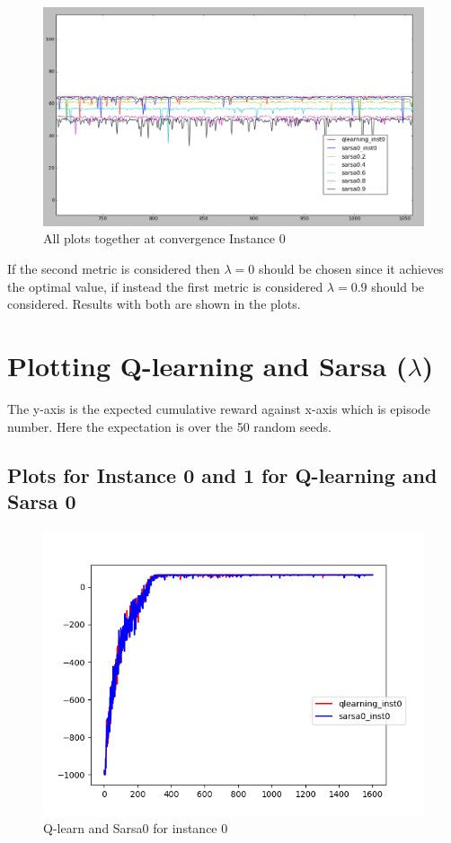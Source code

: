 \documentclass{article}
\begin{document}
\begin{figure}[H]
  \centering
  \includegraphics[scale=0.25]{images/all_plots_inst0_converg}
  \caption{All plots together at convergence Instance 0}
  \label{fig:allinst0conv}
\end{figure}

If the second metric is considered then $\lambda=0$ should be chosen since it achieves the optimal value, if instead the first metric is considered $\lambda=0.9$ should be considered. Results with both are shown in the plots.

\section{Plotting Q-learning and Sarsa ($\lambda$)}
The y-axis is the expected cumulative reward against x-axis which is episode number. Here the expectation is over the 50 random seeds.

\subsection{Plots for Instance 0 and 1 for Q-learning and Sarsa 0}

\begin{figure}[H]
  \centering
  \includegraphics[scale=0.5]{images/qlearn_sarsa0_instance0}
  \caption{Q-learn and Sarsa0 for instance 0}
  \label{fig:ins0}
\end{figure}
\end{document}
